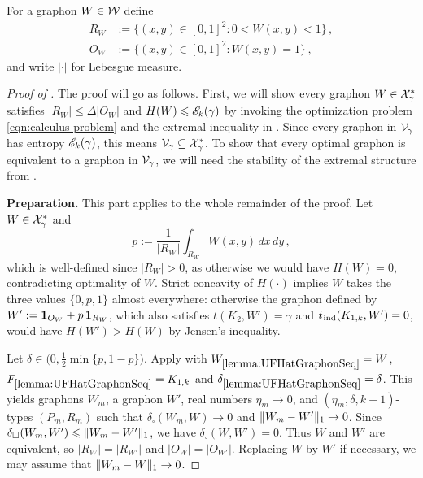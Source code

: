 For a graphon $W\in{\mathcal W}$ define
\begin{align*}
R_W&:=\{(x,y)\in[0,1]^2:0<W(x,y)<1\}\,, \\
O_W&:=\{(x,y)\in[0,1]^2:W(x,y)=1\}\,,
\end{align*}
and write $|\cdot|$ for Lebesgue measure.

\begin{proof}[Proof of ]
The proof will go as follows. First, we will show every graphon $W\in{\mathcal X}^\ast_\gamma$ satisfies $|R_W|\leq\Delta|O_W|$ and $H(W)\leqslant{\mathscr E}_k(\gamma)$ by invoking the optimization problem \eqref{eqn:calculus-problem} and the extremal inequality in . Since every graphon in ${\mathcal V}_\gamma$ has entropy ${\mathscr E}_k(\gamma)$, this means ${\mathcal V}_\gamma\subseteq{\mathcal X}^\ast_\gamma$. To show that every optimal graphon is equivalent to a graphon in ${\mathcal V}_\gamma$, we will need the stability of the extremal structure from .

\smallskip
\noindent\textbf{Preparation.}
This part applies to the whole remainder of the proof.
Let $W\in{\mathcal X}^\ast_\gamma$ and
$$p:=\frac{1}{|R_W|}\int_{R_W}W(x,y)\,dx\,dy\,,$$
which is well-defined since $|R_W|>0$, as otherwise we would have $H(W)=0$, contradicting optimality of $W$. Strict concavity of $H(\cdot)$ implies $W$ takes the three values $\{0,p,1\}$ almost everywhere: otherwise the graphon defined by $W':=\boldsymbol{1}_{O_W}+p\,\boldsymbol{1}_{R_W}$, which also satisfies $t(K_2,W')=\gamma$ and $t_{\hspace{0.2mm}\mathrm{ind}}(K_{1,k},W')=0$, would have $H(W')>H(W)$ by Jensen's inequality.

Let $\delta\in\big(0,\frac12\min\{p,1-p\}\big)$. Apply  with $W_{\ref{lemma:UFHatGraphonSeq}}=W$, $F_{\ref{lemma:UFHatGraphonSeq}}=K_{1,k}$ and $\delta_{\ref{lemma:UFHatGraphonSeq}}=\delta$. This yields graphons $W_m$, a graphon $W'$, real numbers $\eta_m\to0$, and $(\eta_m,\delta,k+1)$-types $(P_m,R_m)$ such that $\delta_\square(W_m,W)\to0$ and $\lVert W_m-W'\rVert_1\to0$. Since $\delta_\square(W_m,W')\leqslant \lVert W_m-W'\rVert_1$, we have $\delta_\square(W,W')=0$. Thus $W$ and $W'$ are equivalent, so $|R_W|=|R_{W'}|$ and $|O_W|=|O_{W'}|$. Replacing $W$ by $W'$ if necessary, we may assume that $\lVert W_m-W\rVert_1\to0$.


\end{proof}
